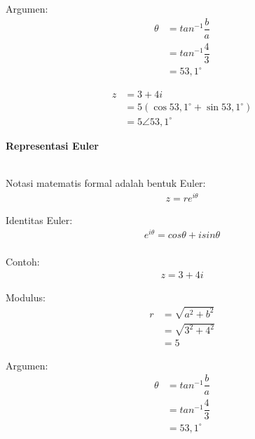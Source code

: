\documentclass{article}
\begin{document}
Argumen:
\begin{align}
    \theta & = tan^{-1} \dfrac{b}{a}
    \nonumber                        \\
           & = tan^{-1} \dfrac{4}{3}
    \nonumber                        \\
           & = 53,1^{\circ}
    \nonumber
\end{align}

\begin{align}
    z & = 3 + 4i
    \nonumber                                      \\
      & = 5(\cos 53,1^{\circ} + \sin 53,1^{\circ})
    \nonumber                                      \\
      & = 5 \angle 53,1^{\circ}
    \nonumber
\end{align}



\newpage
\begin{center}
    \textbf{Representasi Euler}
\end{center}
\leavevmode\\

Notasi matematis formal adalah bentuk Euler:
\begin{align}
    \boxed{z = re^{i\theta}}
    \nonumber
\end{align}

Identitas Euler:
\begin{align}
    \boxed{e^{i\theta} = cos\theta + i sin\theta}
    \nonumber
\end{align}
\leavevmode\\

Contoh:
\begin{align}
    z = 3 + 4i \nonumber
\end{align}

Modulus:
\begin{align}
    r & = \sqrt{a^2 + b^2}
    \nonumber              \\
      & = \sqrt{3^2 + 4^2}
    \nonumber              \\
      & = 5
    \nonumber
\end{align}

Argumen:
\begin{align}
    \theta & = tan^{-1} \dfrac{b}{a}
    \nonumber                        \\
           & = tan^{-1} \dfrac{4}{3}
    \nonumber                        \\
           & = 53,1^{\circ}
    \nonumber
\end{align}
\end{document}
